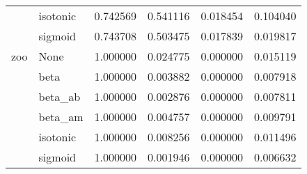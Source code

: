 \begin{tabular}{llrrrr}
        & isotonic &  0.742569 &  0.541116 &  0.018454 &  0.104040 \\
        & sigmoid &  0.743708 &  0.503475 &  0.017839 &  0.019817 \\
zoo & None &  1.000000 &  0.024775 &  0.000000 &  0.015119 \\
        & beta &  1.000000 &  0.003882 &  0.000000 &  0.007918 \\
        & beta\_ab &  1.000000 &  0.002876 &  0.000000 &  0.007811 \\
        & beta\_am &  1.000000 &  0.004757 &  0.000000 &  0.009791 \\
        & isotonic &  1.000000 &  0.008256 &  0.000000 &  0.011496 \\
        & sigmoid &  1.000000 &  0.001946 &  0.000000 &  0.006632 \\
\bottomrule
\end{tabular}
